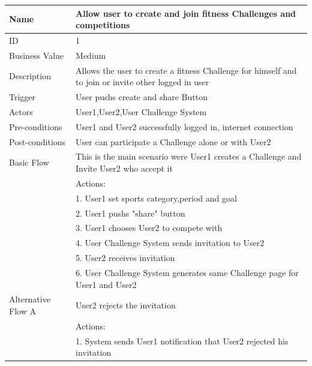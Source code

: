 \documentclass{article}
\begin{document}
\begin{table}[h!]
    \begin{tabularx}{\textwidth}{|>{\raggedright\arraybackslash}p{}|X|}
        \hline
        Name             & Allow user to create and join fitness Challenges and competitions                               \\ \hline
        ID               & 1                                                                                   \\ \hline
        Business Value   & Medium                                                                                  \\ \hline
        Description      & Allows the user to create a fitness Challenge for himself and to join or invite other logged in user\\ \hline
        Trigger          & User pushs create and share Button \\ \hline
        Actors           & User1,User2,User Challenge System                        \\ \hline
        Pre-conditions   & User1 and User2 successfully logged in, internet connection                                  \\ \hline
        Post-conditions  & User can participate a Challenge alone or with User2                                                        \\ \hline
        Basic Flow       & This is the main scenario were User1 creates a Challenge and Invite User2 who accept it\\ \hline
                         & Actions: \\
                         & 1. User1 set sports category,period and goal\\
                         & 2. User1 pushs "share" button \\
                         & 3. User1 chooses User2 to compete with\\
                         & 4. User Challenge System sends invitation to User2 \\
                         & 5. User2 receives invitation\\
                         & 6. User Challenge System generates same Challenge page for User1 and User2 \\ \hline
        Alternative Flow A & User2 rejects the invitation\\
                         & Actions: \\
                         & 1. System sends User1 notification that User2 rejected his invitation \\

\end{tabularx}
\end{table}
\end{document}

